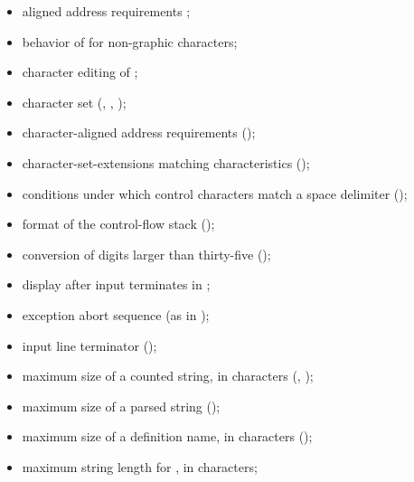\begin{itemize}
\item aligned address requirements ;

\item behavior of  for non-graphic characters;

\item character editing of ;

\item character set (,
	, );

\item character-aligned address requirements
	();

\item character-set-extensions matching characteristics
	();

\item conditions under which control characters match a space
	delimiter ();

\item format of the control-flow stack
	();

\item conversion of digits larger than thirty-five
	();

\item display after input terminates in ;

\item exception abort sequence (as in );

\item input line terminator ();

\item maximum size of a counted string, in characters
	(, );

\item maximum size of a parsed string
	();

\item maximum size of a definition name, in characters
	();

\item maximum string length for
	, in characters;


\end{itemize}
